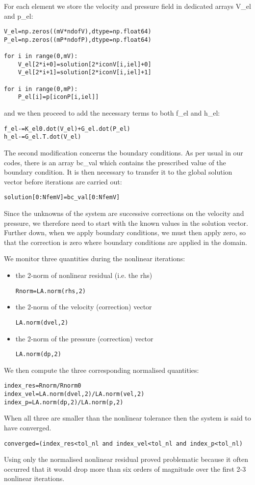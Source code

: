 For each element we store the velocity and pressure field in dedicated arrays
{\codefont V\_el} and {\codefont p\_el}:

\begin{lstlisting}
V_el=np.zeros((mV*ndofV),dtype=np.float64)
P_el=np.zeros((mP*ndofP),dtype=np.float64)

for i in range(0,mV):
    V_el[2*i+0]=solution[2*iconV[i,iel]+0]
    V_el[2*i+1]=solution[2*iconV[i,iel]+1]

for i in range(0,mP):
    P_el[i]=p[iconP[i,iel]]
\end{lstlisting}
and we then proceed to add the necessary terms to both {\codefont f\_el} and {\codefont h\_el}:
\begin{lstlisting}
f_el-=K_el0.dot(V_el)+G_el.dot(P_el) 
h_el-=G_el.T.dot(V_el)               
\end{lstlisting}

The second modification concerns the boundary conditions. 
As per usual in our codes, there is an array {\codefont bc\_val} 
which contains the prescribed value of the boundary condition.
It is then necessary to transfer it to the global solution vector 
before iterations are carried out:
\begin{lstlisting}
solution[0:NfemV]=bc_val[0:NfemV]
\end{lstlisting}
Since the unknowns of the system are successive corrections on the 
velocity and pressure, we therefore need to start with the known 
values in the solution vector. Further down, when we apply boundary conditions, 
we must then apply zero, so that the correction is zero where 
boundary conditions are applied in the domain.  

We monitor three quantities during the nonlinear iterations:
\begin{itemize}
\item the 2-norm of nonlinear residual (i.e. the rhs)
\begin{lstlisting}
Rnorm=LA.norm(rhs,2) 
\end{lstlisting}
\item the 2-norm of the velocity (correction) vector
\begin{lstlisting}
LA.norm(dvel,2)
\end{lstlisting}
\item the 2-norm of the pressure (correction) vector
\begin{lstlisting}
LA.norm(dp,2)
\end{lstlisting}
\end{itemize}
We then compute the three corresponding normalised quantities:
\begin{lstlisting}
index_res=Rnorm/Rnorm0
index_vel=LA.norm(dvel,2)/LA.norm(vel,2)
index_p=LA.norm(dp,2)/LA.norm(p,2)
\end{lstlisting}
When all three are smaller than the nonlinear tolerance then the system is said to have converged. 
\begin{lstlisting}
converged=(index_res<tol_nl and index_vel<tol_nl and index_p<tol_nl)
\end{lstlisting}
Using only the normalised nonlinear residual proved problematic because it often occurred that it would drop 
more than six orders of magnitude over the first 2-3 nonlinear iterations. 


